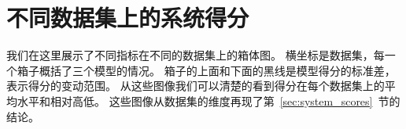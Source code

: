 
\chapter{不同数据集上的系统得分}\label{ch:dataset_system_dist}
我们在这里展示了不同指标在不同的数据集上的箱体图。
横坐标是数据集，每一个箱子概括了三个模型的情况。
箱子的上面和下面的黑线是模型得分的标准差，表示得分的变动范围。
从这些图像我们可以清楚的看到得分在每个数据集上的平均水平和相对高低。
这些图像从数据集的维度再现了第~\ref{sec:system_scores}~节的结论。





